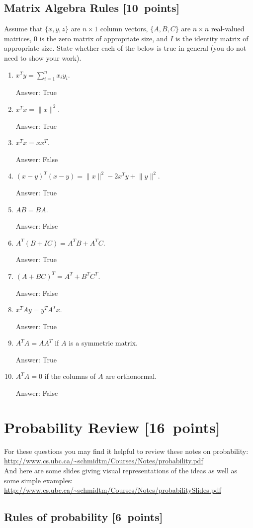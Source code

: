 \documentclass{article}
\newcommand{\blu}[1]{{\textcolor{blu}{#1}}}
\newcommand{\gre}[1]{\textcolor{gre}{#1}}
\newcommand\ans[1]{\par\gre{Answer: #1}}
\let\ask\blu
\newcommand\pts[1]{\textcolor{pointscolour}{[#1~points]}}
\newcommand{\norm}[1]{\lVert #1 \rVert}
\begin{document}
  \subsection{Matrix Algebra Rules \pts{10}}

  Assume that $\{x,y,z\}$ are $n \times 1$ column vectors, $\{A,B,C\}$ are $n \times n$ real-valued matrices, $0$ is the zero matrix of appropriate size, and $I$ is the identity matrix of appropriate size. \ask{State whether each of the below is true in general} (you do not need to show your work).

  \begin{enumerate}
  \item $x^Ty = \sum_{i=1}^n x_iy_i$.
  \ans{True}
  \item $x^Tx = \norm{x}^2$.
  \ans{True}
  \item $x^Tx = xx^T$.
  \ans{False}
  \item $(x-y)^T(x-y) = \norm{x}^2 - 2x^Ty + \norm{y}^2$.
  \ans{True}
  \item $AB=BA$.
  \ans{False}
  \item $A^T(B + IC) = A^TB + A^TC$.
  \ans{True}
  \item $(A + BC)^T = A^T + B^TC^T$.
  \ans{False}
  \item $x^TAy = y^TA^Tx$.
  \ans{True}
  \item $A^TA = AA^T$ if $A$ is a symmetric matrix.
  \ans{True}
  \item $A^TA = 0$ if the columns of $A$ are orthonormal.
  \ans{False}
  \end{enumerate}
  \newpage
  \clearpage\section{Probability Review \pts{16}}


  For these questions you may find it helpful to review these notes on probability:\\
  \url{http://www.cs.ubc.ca/~schmidtm/Courses/Notes/probability.pdf}\\
  And here are some slides giving visual representations of the ideas as well as some simple examples:\\
  \url{http://www.cs.ubc.ca/~schmidtm/Courses/Notes/probabilitySlides.pdf}

  \subsection{Rules of probability \pts{6}}
\end{document}
